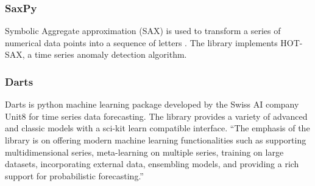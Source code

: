 \subsubsection{SaxPy}

Symbolic Aggregate approximation (SAX) is used to transform a series of numerical data points into a sequence of letters \parencite{senin2018grammarviz-saxpy}. The library implements HOT-SAX, a time series anomaly detection algorithm. 


\subsubsection{Darts}
Darts is python machine learning package developed by the Swiss AI company Unit8 for time series data forecasting. The library provides a variety of advanced and classic models with a sci-kit learn compatible interface. \enquote{The emphasis of the library is on offering modern machine learning functionalities such as supporting multidimensional series, meta-learning on multiple series, training on large datasets, incorporating external data, ensembling models, and providing a rich support for probabilistic forecasting.} 

